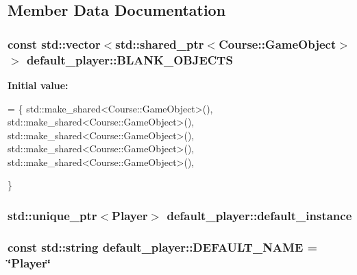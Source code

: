 \subsection{Member Data Documentation}
\hypertarget{classdefault__player_a8e10659ac91777b9f496a0c2e5b1beb9}{
\subsubsection[{B\-L\-A\-N\-K\-\_\-\-O\-B\-J\-E\-C\-T\-S}]{\setlength{\rightskip}{0pt plus 5cm}const std\-::vector$<$std\-::shared\-\_\-ptr$<${\bf Course\-::\-Game\-Object}$>$ $>$ default\-\_\-player\-::\-B\-L\-A\-N\-K\-\_\-\-O\-B\-J\-E\-C\-T\-S\hspace{0.3cm}{\ttfamily [private]}}}\label{classdefault__player_a8e10659ac91777b9f496a0c2e5b1beb9}
{\bfseries Initial value\-:}
\begin{DoxyCode}
= \{
        std::make\_shared<Course::GameObject>(),
        std::make\_shared<Course::GameObject>(),
        std::make\_shared<Course::GameObject>(),
        std::make\_shared<Course::GameObject>(),
        std::make\_shared<Course::GameObject>(),

    \}
\end{DoxyCode}
\hypertarget{classdefault__player_a6c7680ccb072390ffcbef8a1b95739c3}{
\subsubsection[{default\-\_\-instance}]{\setlength{\rightskip}{0pt plus 5cm}std\-::unique\-\_\-ptr$<${\bf Player}$>$ default\-\_\-player\-::default\-\_\-instance\hspace{0.3cm}{\ttfamily [private]}}}\label{classdefault__player_a6c7680ccb072390ffcbef8a1b95739c3}
\hypertarget{classdefault__player_a8b90651e56d9ca9aa126384f2890b431}{
\subsubsection[{D\-E\-F\-A\-U\-L\-T\-\_\-\-N\-A\-M\-E}]{\setlength{\rightskip}{0pt plus 5cm}const std\-::string default\-\_\-player\-::\-D\-E\-F\-A\-U\-L\-T\-\_\-\-N\-A\-M\-E = \char`\"{}Player\char`\"{}\hspace{0.3cm}{\ttfamily [private]}}}\label{classdefault__player_a8b90651e56d9ca9aa126384f2890b431}

